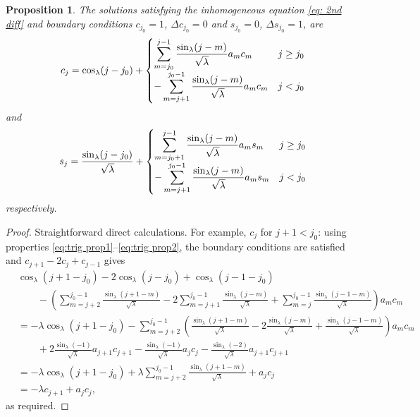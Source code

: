 \documentclass[11pt]{article}
\newtheorem{prop}{Proposition}
\theoremstyle{definition}
\begin{document}
\begin{prop}
The solutions satisfying the inhomogeneous equation \eqref{eq: 2nd diff} and boundary conditions $c_{j_0}=1$, $\Delta c_{j_0}=0$ and $s_{j_0}=0$, $\Delta s_{j_0}=1$, are
\begin{equation}\label{eq: c_{j}}
c_{j}=\cos_\lambda(j-j_0)+
\begin{cases}
\displaystyle
\sum_{m=j_0}^{j-1}\frac{\sin_\lambda(j-m)}{\sqrt\lambda} a_{m} c_{m}  &  j\ge j_0\\
\displaystyle
-\sum_{m=j+1}^{j_0-1}\frac{\sin_\lambda(j-m)}{\sqrt\lambda} a_{m} c_{m}  &  j< j_0	
\end{cases}
\end{equation}
and
\begin{equation}\label{eq: s_{j}}
s_{j}=\frac{\sin_\lambda(j-j_0)}{\sqrt\lambda}+
\begin{cases}
\displaystyle
\sum_{m=j_0+1}^{j-1}\frac{\sin_\lambda(j-m)}{\sqrt\lambda} a_{m} s_{m}  &  j\ge j_0\\
\displaystyle
-\sum_{m=j+1}^{j_0-1}\frac{\sin_\lambda(j-m)}{\sqrt\lambda} a_{m} s_{m}  &  j< j_0	
\end{cases}
\end{equation}
respectively.
\end{prop}
\begin{proof}
Straightforward direct calculations. For example, $c_{j}$ for $j+1<j_0$: using properties \eqref{eq:trig prop1}--\eqref{eq:trig prop2}, the boundary conditions are satisfied and $c_{j+1}-2c_{j}+c_{j-1}$ gives
\begin{align*}
&\cos_\lambda(j+1-j_0)-2\cos_\lambda(j-j_0)+\cos_\lambda(j-1-j_0)\\
&\qquad-\left(\sum_{m=j+2}^{j_0-1}\frac{\sin_\lambda(j+1-m)}{\sqrt\lambda}-2\sum_{m=j+1}^{j_0-1}\frac{\sin_\lambda(j-m)}{\sqrt\lambda}+\sum_{m=j}^{j_0-1}\frac{\sin_\lambda(j-1-m)}{\sqrt\lambda}\right) a_{m} c_{m}\\	
&=-\lambda\cos_\lambda(j+1-j_0)-\sum_{m=j+2}^{j_0-1}\left(\frac{\sin_\lambda(j+1-m)}{\sqrt\lambda}-2\frac{\sin_\lambda(j-m)}{\sqrt\lambda}+\frac{\sin_\lambda(j-1-m)}{\sqrt\lambda}\right) a_{m} c_{m}\\
&\qquad+2\frac{\sin_\lambda(-1)}{\sqrt\lambda}a_{j+1}c_{j+1}-\frac{\sin_\lambda(-1)}{\sqrt\lambda}a_{j}c_{j}
-\frac{\sin_\lambda(-2)}{\sqrt\lambda}a_{j+1}c_{j+1}\\
&=-\lambda\cos_\lambda(j+1-j_0)+\lambda\sum_{m=j+2}^{j_0-1}\frac{\sin_\lambda(j+1-m)}{\sqrt\lambda}
+a_{j}c_{j}\\
&=-\lambda c_{j+1}+a_{j}c_{j},
\end{align*}
as required.
\end{proof}
\end{document}
